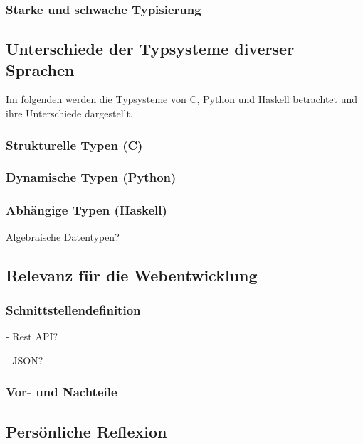 \subsubsection{Starke und schwache Typisierung}

\subsection{Unterschiede der Typsysteme diverser Sprachen}

Im folgenden werden die Typsysteme von C, Python und Haskell betrachtet und ihre Unterschiede dargestellt.

\subsubsection{Strukturelle Typen (C)}\label{sec:structural_types}
\subsubsection{Dynamische Typen (Python)} %
\subsubsection{Abhängige Typen (Haskell)}

Algebraische Datentypen?

\subsection{Relevanz für die Webentwicklung}

\subsubsection{Schnittstellendefinition}

- Rest API?

- JSON?

\subsubsection{Vor- und Nachteile}

\subsection{Persönliche Reflexion}
